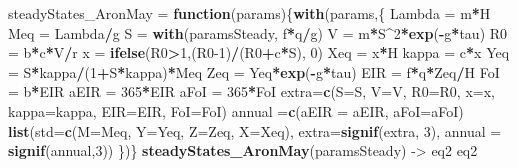 \documentclass[
]{book}
\newenvironment{Shaded}{\begin{snugshade}}{\end{snugshade}}
\newcommand{\AttributeTok}[1]{\textcolor[rgb]{0.13,0.29,0.53}{#1}}
\newcommand{\ControlFlowTok}[1]{\textcolor[rgb]{0.13,0.29,0.53}{\textbf{#1}}}
\newcommand{\DecValTok}[1]{\textcolor[rgb]{0.00,0.00,0.81}{#1}}
\newcommand{\FunctionTok}[1]{\textcolor[rgb]{0.13,0.29,0.53}{\textbf{#1}}}
\newcommand{\NormalTok}[1]{#1}
\newcommand{\OtherTok}[1]{\textcolor[rgb]{0.56,0.35,0.01}{#1}}
\newcommand{\SpecialCharTok}[1]{\textcolor[rgb]{0.81,0.36,0.00}{\textbf{#1}}}
\begin{document}
\begin{Shaded}
\begin{Highlighting}[]
\NormalTok{steadyStates\_AronMay }\OtherTok{=} \ControlFlowTok{function}\NormalTok{(params)\{}\FunctionTok{with}\NormalTok{(params,\{}
\NormalTok{  Lambda }\OtherTok{=}\NormalTok{ m}\SpecialCharTok{*}\NormalTok{H}
\NormalTok{  Meq }\OtherTok{=}\NormalTok{ Lambda}\SpecialCharTok{/}\NormalTok{g}
\NormalTok{  S }\OtherTok{=} \FunctionTok{with}\NormalTok{(paramsSteady, f}\SpecialCharTok{*}\NormalTok{q}\SpecialCharTok{/}\NormalTok{g)}
\NormalTok{  V }\OtherTok{=}\NormalTok{ m}\SpecialCharTok{*}\NormalTok{S}\SpecialCharTok{\^{}}\DecValTok{2}\SpecialCharTok{*}\FunctionTok{exp}\NormalTok{(}\SpecialCharTok{{-}}\NormalTok{g}\SpecialCharTok{*}\NormalTok{tau)}
\NormalTok{  R0 }\OtherTok{=}\NormalTok{ b}\SpecialCharTok{*}\NormalTok{c}\SpecialCharTok{*}\NormalTok{V}\SpecialCharTok{/}\NormalTok{r}
\NormalTok{  x }\OtherTok{=} \FunctionTok{ifelse}\NormalTok{(R0}\SpecialCharTok{\textgreater{}}\DecValTok{1}\NormalTok{,(R0}\DecValTok{{-}1}\NormalTok{)}\SpecialCharTok{/}\NormalTok{(R0}\SpecialCharTok{+}\NormalTok{c}\SpecialCharTok{*}\NormalTok{S), }\DecValTok{0}\NormalTok{) }
\NormalTok{  Xeq }\OtherTok{=}\NormalTok{ x}\SpecialCharTok{*}\NormalTok{H}
\NormalTok{  kappa }\OtherTok{=}\NormalTok{ c}\SpecialCharTok{*}\NormalTok{x}
\NormalTok{  Yeq }\OtherTok{=}\NormalTok{ S}\SpecialCharTok{*}\NormalTok{kappa}\SpecialCharTok{/}\NormalTok{(}\DecValTok{1}\SpecialCharTok{+}\NormalTok{S}\SpecialCharTok{*}\NormalTok{kappa)}\SpecialCharTok{*}\NormalTok{Meq }
\NormalTok{  Zeq }\OtherTok{=}\NormalTok{ Yeq}\SpecialCharTok{*}\FunctionTok{exp}\NormalTok{(}\SpecialCharTok{{-}}\NormalTok{g}\SpecialCharTok{*}\NormalTok{tau) }
\NormalTok{  EIR }\OtherTok{=}\NormalTok{ f}\SpecialCharTok{*}\NormalTok{q}\SpecialCharTok{*}\NormalTok{Zeq}\SpecialCharTok{/}\NormalTok{H}
\NormalTok{  FoI }\OtherTok{=}\NormalTok{ b}\SpecialCharTok{*}\NormalTok{EIR}
\NormalTok{  aEIR }\OtherTok{=} \DecValTok{365}\SpecialCharTok{*}\NormalTok{EIR }
\NormalTok{  aFoI }\OtherTok{=} \DecValTok{365}\SpecialCharTok{*}\NormalTok{FoI }
\NormalTok{  extra}\OtherTok{=}\FunctionTok{c}\NormalTok{(}\AttributeTok{S=}\NormalTok{S, }\AttributeTok{V=}\NormalTok{V, }\AttributeTok{R0=}\NormalTok{R0, }\AttributeTok{x=}\NormalTok{x, }\AttributeTok{kappa=}\NormalTok{kappa, }
          \AttributeTok{EIR=}\NormalTok{EIR, }\AttributeTok{FoI=}\NormalTok{FoI)}
\NormalTok{  annual }\OtherTok{=}\FunctionTok{c}\NormalTok{(}\AttributeTok{aEIR =}\NormalTok{ aEIR, }\AttributeTok{aFoI=}\NormalTok{aFoI)}
  \FunctionTok{list}\NormalTok{(}\AttributeTok{std=}\FunctionTok{c}\NormalTok{(}\AttributeTok{M=}\NormalTok{Meq, }\AttributeTok{Y=}\NormalTok{Yeq, }\AttributeTok{Z=}\NormalTok{Zeq, }\AttributeTok{X=}\NormalTok{Xeq), }
       \AttributeTok{extra=}\FunctionTok{signif}\NormalTok{(extra, }\DecValTok{3}\NormalTok{),}
       \AttributeTok{annual =} \FunctionTok{signif}\NormalTok{(annual,}\DecValTok{3}\NormalTok{)) }
\NormalTok{\})\}}
\FunctionTok{steadyStates\_AronMay}\NormalTok{(paramsSteady) }\OtherTok{{-}\textgreater{}}\NormalTok{ eq2}
\NormalTok{eq2}
\end{Highlighting}
\end{Shaded}
\end{document}
